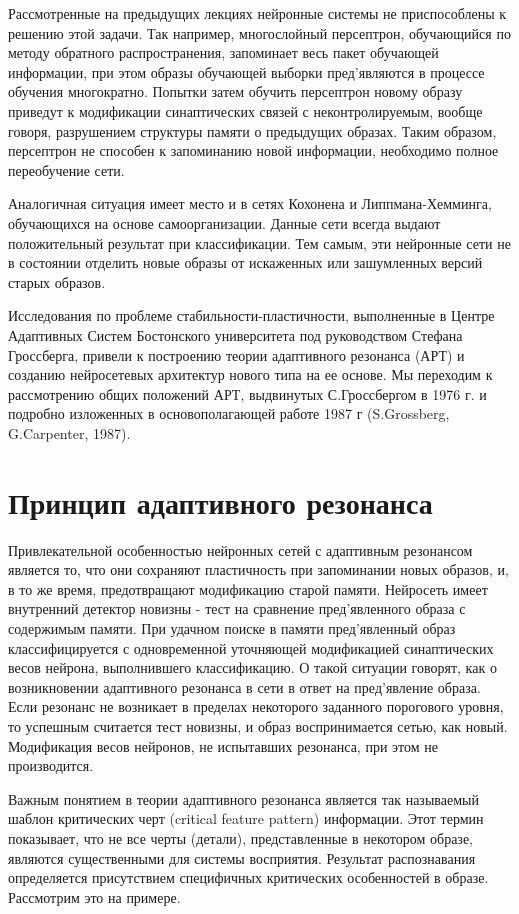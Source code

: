 \documentclass[12pt,a4paper,article]{article}
\begin{document}
Рассмотренные на предыдущих лекциях нейронные системы не приспособлены к решению этой задачи. Так например, многослойный персептрон, обучающийся по методу обратного распространения, запоминает весь пакет обучающей информации, при этом образы обучающей выборки пред'являются в процессе обучения многократно. Попытки затем обучить персептрон новому образу приведут к модификации синаптических связей с неконтролируемым, вообще говоря, разрушением структуры памяти о предыдущих образах. Таким образом, персептрон не способен к запоминанию новой информации, необходимо полное переобучение сети.

Аналогичная ситуация имеет место и в сетях Кохонена и Липпмана-Хемминга, обучающихся на основе самоорганизации. Данные сети всегда выдают положительный результат при классификации. Тем самым, эти нейронные сети не в состоянии отделить новые образы от искаженных или зашумленных версий старых образов.

Исследования по проблеме стабильности-пластичности, выполненные в Центре Адаптивных Систем Бостонского университета под руководством Стефана Гроссберга, привели к построению теории адаптивного резонанса (АРТ) и созданию нейросетевых архитектур нового типа на ее основе. Мы переходим к рассмотрению общих положений АРТ, выдвинутых С.Гроссбергом в 1976 г. и подробно изложенных в основополагающей работе 1987 г (S.Grossberg, G.Carpenter, 1987).

\section{Принцип адаптивного резонанса}
Привлекательной особенностью нейронных сетей с адаптивным резонансом является то, что они сохраняют пластичность при запоминании новых образов, и, в то же время, предотвращают модификацию старой памяти. Нейросеть имеет внутренний детектор новизны - тест на сравнение пред'явленного образа с содержимым памяти. При удачном поиске в памяти пред'явленный образ классифицируется с одновременной уточняющей модификацией синаптических весов нейрона, выполнившего классификацию. О такой ситуации говорят, как о возникновении адаптивного резонанса в сети в ответ на пред'явление образа. Если резонанс не возникает в пределах некоторого заданного порогового уровня, то успешным считается тест новизны, и образ воспринимается сетью, как новый. Модификация весов нейронов, не испытавших резонанса, при этом не производится.

Важным понятием в теории адаптивного резонанса является так называемый шаблон критических черт (critical feature pattern) информации. Этот термин показывает, что не все черты (детали), представленные в некотором образе, являются существенными для системы восприятия. Результат распознавания определяется присутствием специфичных критических особенностей в образе. Рассмотрим это на примере.
\end{document}
